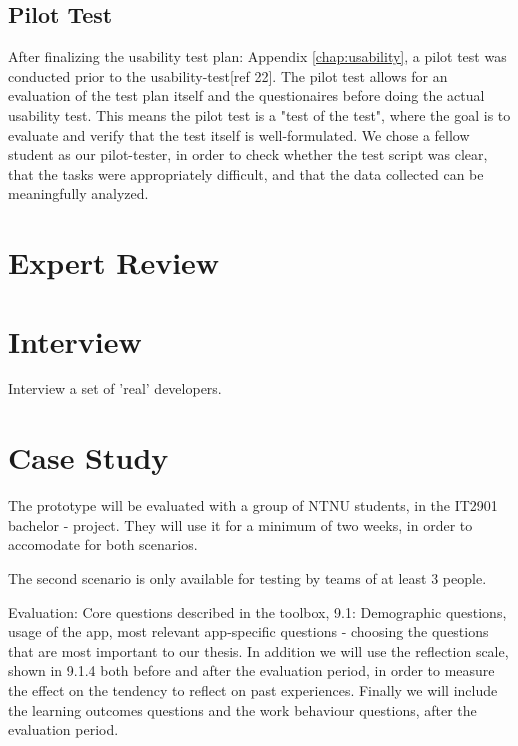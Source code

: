 \subsection{Pilot Test}
After finalizing the usability test plan: Appendix \ref{chap:usability}, a pilot test was conducted prior to the usability-test[ref 22]. The pilot test allows for an evaluation of the test plan itself and the questionaires before doing the actual usability test. This means the pilot test is a "test of the test", where the goal is to evaluate and verify that the test itself is well-formulated. We chose a fellow student as our pilot-tester, in order to check whether the test script was clear, that the tasks were appropriately difficult, and that the data collected can be meaningfully analyzed.  



\section{Expert Review}

\section{Interview}
Interview a set of 'real' developers.

\section{Case Study}
The prototype will be evaluated with a group of NTNU students, in the IT2901 bachelor - project. They will use it for a minimum of two weeks, in order to accomodate for both scenarios.

The second scenario is only available for testing by teams of at least 3 people.

Evaluation:
Core questions described in the toolbox, 9.1:
Demographic questions, usage of the app, most relevant app-specific questions - choosing the questions that are most important to our thesis. 
In addition we will use the reflection scale, shown in 9.1.4 both before and after the evaluation period, in order to measure the effect on the tendency to reflect on past
experiences. Finally we will include the learning outcomes questions and the work behaviour questions, after the evaluation period. 

